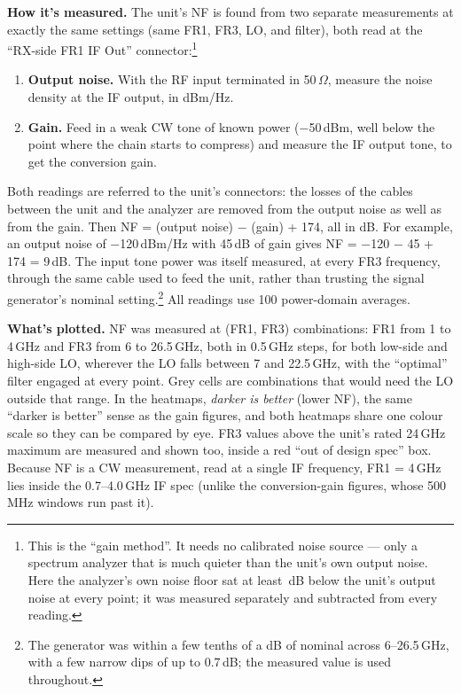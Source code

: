 \textbf{How it's measured.} The unit's NF is found from two separate measurements at exactly the same
settings (same FR1, FR3, LO, and filter), both read at the ``RX-side FR1 IF Out'' connector:\footnote{This is the
``gain method''. It needs no calibrated noise source --- only a spectrum analyzer that is much quieter than
the unit's own output noise. Here the analyzer's own noise floor sat at least \nfMinMargin\,dB below the unit's
output noise at every point; it was measured separately and subtracted from every reading.}
\begin{enumerate}
  \item \textbf{Output noise.} With the RF input terminated in 50\,$\Omega$, measure the noise density at the IF
        output, in dBm/Hz.
  \item \textbf{Gain.} Feed in a weak CW tone of known power (−50\,dBm, well below the point where the chain
        starts to compress) and measure the IF output tone, to get the conversion gain.
\end{enumerate}
Both readings are referred to the unit's connectors: the losses of the cables between the unit and the analyzer
are removed from the output noise as well as from the gain. Then NF = (output noise) − (gain) + 174, all in dB. For example, an output noise of −120\,dBm/Hz with
45\,dB of gain gives NF = −120 − 45 + 174 = 9\,dB. The input tone power was itself measured, at every FR3
frequency, through the same cable used to feed the unit, rather than trusting the signal generator's
nominal setting.\footnote{The generator was within a few tenths of a dB of nominal across 6--26.5\,GHz,
with a few narrow dips of up to 0.7\,dB; the measured value is used throughout.} All readings use 100
power-domain averages.

\textbf{What's plotted.} NF was measured at \nfCount{} (FR1, FR3) combinations: FR1 from 1 to 4\,GHz and FR3
from 6 to 26.5\,GHz, both in 0.5\,GHz steps, for both low-side and high-side LO, wherever the LO falls between
7 and 22.5\,GHz, with the ``optimal'' filter engaged at every point. Grey cells
are combinations that would need the LO outside that range. In the heatmaps, \emph{darker is better} (lower NF),
the same ``darker is better'' sense as the gain figures, and both heatmaps share one colour scale so they can be
compared by eye. FR3 values above the unit's rated 24\,GHz maximum are measured and shown too, inside a red ``out of
design spec'' box. Because NF is a CW measurement, read at a single IF frequency, FR1 = 4\,GHz lies inside the
0.7--4.0\,GHz IF spec (unlike the conversion-gain figures, whose 500\,MHz windows run past it).

